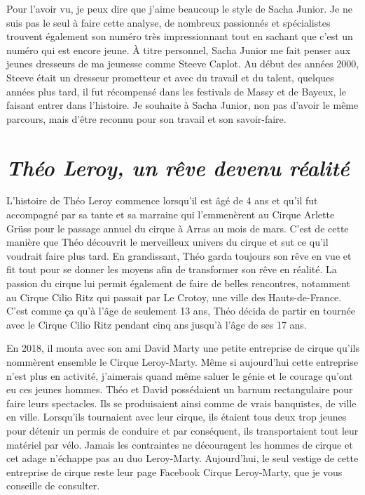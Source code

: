 Pour l'avoir vu, je peux dire que j'aime beaucoup le style de Sacha Junior. Je ne suis pas le seul à faire cette analyse, de nombreux passionnés et spécialistes trouvent également son numéro très impressionnant tout en sachant que c'est un numéro qui est encore jeune. À titre personnel, Sacha Junior me fait penser aux jeunes dresseurs de ma jeunesse comme Steeve Caplot. Au début des années 2000, Steeve était un dresseur prometteur et avec du travail et du talent, quelques années plus tard, il fut récompensé dans les festivals de Massy et de Bayeux, le faisant entrer dans l'histoire. Je souhaite à Sacha Junior, non pas d'avoir le même parcours, mais d'être reconnu pour son travail et son savoir-faire. 

\section*{\textit{Théo Leroy, un rêve devenu réalité }}
{}
\noindent
L'histoire de Théo Leroy commence lorsqu’il est âgé de 4 ans et qu'il fut accompagné par sa tante et sa marraine qui l'emmenèrent au Cirque Arlette Grüss pour le passage annuel du cirque à Arras au mois de mars. C'est de cette manière que Théo découvrit le merveilleux univers du cirque et sut ce qu'il voudrait faire plus tard. En grandissant, Théo garda toujours son rêve en vue et fit tout pour se donner les moyens afin de transformer son rêve en réalité. La passion du cirque lui permit également de faire de belles rencontres, notamment au Cirque Cilio Ritz qui passait par Le Crotoy, une ville des Hauts-de-France. C'est comme ça qu'à l'âge de seulement 13 ans, Théo décida de partir en tournée avec le Cirque Cilio Ritz pendant cinq ans jusqu'à l'âge de ses 17 ans.

En 2018, il monta avec son ami David Marty une petite entreprise de cirque qu'ils nommèrent ensemble le Cirque Leroy-Marty. Même si aujourd'hui cette entreprise n'est plus en activité, j'aimerais quand même saluer le génie et le courage qu'ont eu ces jeunes hommes. Théo et David possédaient un barnum rectangulaire pour faire leurs spectacles. Ils se produisaient ainsi comme de vrais banquistes, de ville en ville. Lorsqu'ils tournaient avec leur cirque, ils étaient tous deux trop jeunes pour détenir un permis de conduire et par conséquent, ils transportaient tout leur matériel par vélo. Jamais les contraintes ne découragent les hommes de cirque et cet adage n'échappe pas au duo Leroy-Marty. Aujourd'hui, le seul vestige de cette entreprise de cirque reste leur page Facebook Cirque Leroy-Marty, que je vous conseille de consulter.

